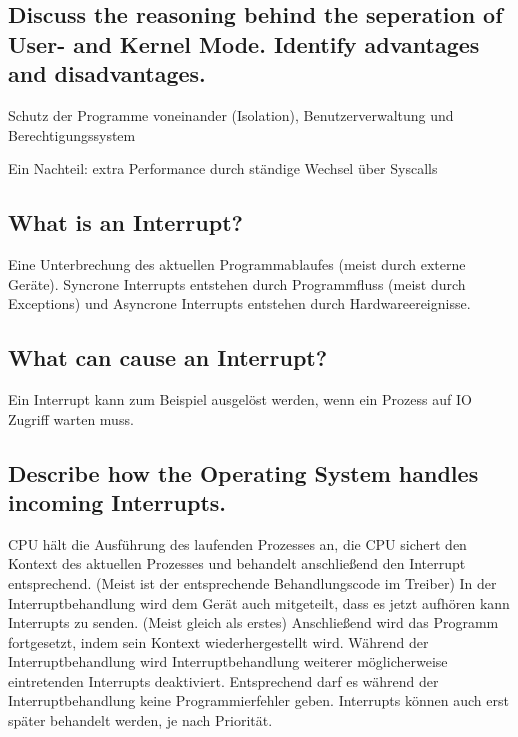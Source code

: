 \subsection{Discuss the reasoning behind the seperation of User- and Kernel Mode. Identify advantages and disadvantages.}
Schutz der Programme voneinander (Isolation), Benutzerverwaltung und Berechtigungssystem

Ein Nachteil: extra Performance durch ständige Wechsel über Syscalls

\subsection{What is an Interrupt?}
Eine Unterbrechung des aktuellen Programmablaufes (meist durch externe Geräte).
Syncrone Interrupts entstehen durch Programmfluss (meist durch Exceptions) und Asyncrone Interrupts entstehen durch Hardwareereignisse.

\subsection{What can cause an Interrupt?}
Ein Interrupt kann zum Beispiel ausgel\"ost werden, wenn ein Prozess auf IO Zugriff warten muss.

\subsection{Describe how the Operating System handles incoming Interrupts.}
CPU hält die Ausführung des laufenden Prozesses an, die CPU sichert den Kontext des aktuellen Prozesses und  behandelt anschließend den Interrupt entsprechend.
(Meist ist der entsprechende Behandlungscode im Treiber)
In der Interruptbehandlung wird dem Gerät auch mitgeteilt, dass es jetzt aufhören kann Interrupts zu senden.
(Meist gleich als erstes)
Anschließend wird das Programm fortgesetzt, indem sein Kontext wiederhergestellt wird.
Während der Interruptbehandlung wird Interruptbehandlung weiterer möglicherweise eintretenden Interrupts deaktiviert.
Entsprechend darf es während der Interruptbehandlung keine Programmierfehler geben.
Interrupts können auch erst später behandelt werden, je nach Priorität.

